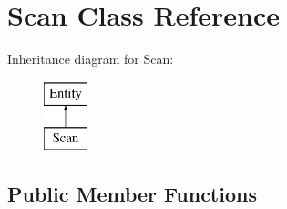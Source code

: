 \hypertarget{classScan}{
\section{Scan Class Reference}
\label{classScan}
}
Inheritance diagram for Scan:\begin{figure}[H]
\begin{center}
\leavevmode
\includegraphics[height=2.000000cm]{classScan}
\end{center}
\end{figure}
\subsection*{Public Member Functions}
